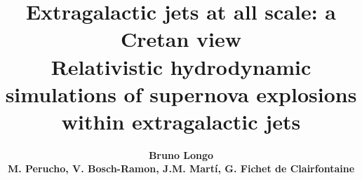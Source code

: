 \documentclass[unknownkeysallowed,table]{beamer}
\title[]{{\small Extragalactic jets at all scale: a Cretan view}\vspace{.5cm} \\
\bf{Relativistic hydrodynamic simulations of supernova explosions within extragalactic jets}}
\author[]{\huge \bf{ Bruno Longo} \\
{\scriptsize M. Perucho, V. Bosch-Ramon, J.M. Mart\'i, G. Fichet de Clairfontaine}}
\institute[]{Departament d'Astronomia i Astrof\'isica, Universitat de València }
\begin{document}
\begin{frame}[plain]
\maketitle
\end{frame}



\end{document}
